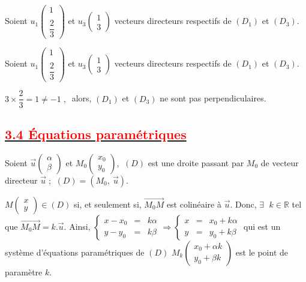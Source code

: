 \documentclass[12pt]{article}
\begin{document}
Soient $u_{1}\begin{pmatrix} 1 \\ \\ \dfrac{2}{3}\end{pmatrix}$ et $u_{3}\begin{pmatrix} 1 \\ 3\end{pmatrix}$ vecteurs directeurs respectifs de $(D_{1})$ et $(D_{3}).$

Soient $u_{1}\begin{pmatrix} 1 \\ \\ \dfrac{2}{3}\end{pmatrix}$ et $u_{3}\begin{pmatrix} 1 \\ 3\end{pmatrix}$ vecteurs directeurs respectifs de $(D_{1})$ et $(D_{3}).$

$3\times\dfrac{2}{3}=1\neq -1\;,\ $ alors, $(D_{1})$ et $(D_{3})$ ne sont pas perpendiculaires.

\subsection*{\underline{\textcolor{red}{\textbf{3.4 Équations paramétriques}}}}
Soient $\vec{u}\begin{pmatrix} \alpha\\ \beta \end{pmatrix}$ et $M_{0}\begin{pmatrix} x_{0}\\ y_{0} \end{pmatrix}$, $\ (D)$ est une droite passant par $M_{0}$ de vecteur directeur $\vec{u}\;$; $\ (D)=(M_{0},\ \vec{u}).$

	$M\begin{pmatrix}
	x\\
	y
	\end{pmatrix}\in(D)$ si, et seulement si, $\overrightarrow{M_{0}M}$ est colinéaire à $\vec{u}.$
	Donc, $\exists\;$ $k\in\mathbb{R}$ tel que $\overrightarrow{M_{0}M}=k.\vec{u}.$
	Ainsi, $\left\lbrace\begin{array}{lcl}
	x-x_{0} &=& k\alpha\\
	y-y_{0} &=& k\beta
	\end{array}
	\right. \Longrightarrow  \left\lbrace\begin{array}{lcl}
	x &=& x_{0}+k\alpha\\
	y &=& y_{0}+k\beta
	\end{array}
	\right.$ qui est un système d'équations paramétriques de $(D)$
	$M_{k}\begin{pmatrix}
	x_{0}+\alpha k\\
	y_{0}+\beta k
	\end{pmatrix}$ est le point de paramètre $k$.
\end{document}
